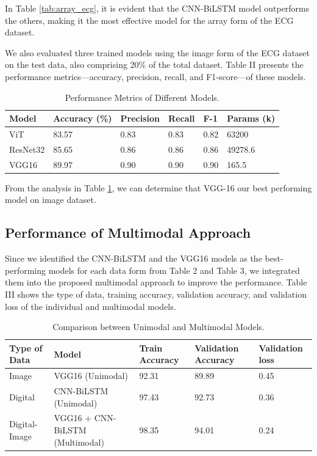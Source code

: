 \documentclass[conference]{IEEEtran}
\begin{document}
In Table \ref{tab:array_ecg}, it is evident that the CNN-BiLSTM model outperforms the others, making it the most effective model for the array form of the ECG dataset.

We also evaluated three trained models using the image form of the ECG dataset on the test data, also comprising 20\% of the total dataset. Table II presents the performance metrics—accuracy, precision, recall, and F1-score—of these models.

\begin{table}[!ht]
\centering
\caption{Performance Metrics of Different Models.}
\begin{tabularx}{\columnwidth}{|X|X|X|X|X|X|}
\hline
Model & Accuracy (\%) & Precision & Recall & F-1 & Params (k) \\ \hline
ViT & 83.57 & 0.83 & 0.83 & 0.82 & 63200 \\ \hline
ResNet32 & 85.65 & 0.86 & 0.86 & 0.86 & 49278.6 \\ \hline
VGG16 & 89.97 & 0.90 & 0.90 & 0.90 & 165.5 \\ \hline
\end{tabularx}
\label{tab:performance_metrics}
\end{table}

From the analysis in Table \ref{tab:performance_metrics}, we can determine that VGG-16 our best performing model on image dataset.

\subsection{Performance of Multimodal Approach}

Since we identified the CNN-BiLSTM and the VGG16 models as the best-performing models for each data form from Table 2 and Table 3, we integrated them into the proposed multimodal approach to improve the performance. Table III shows the type of data, training accuracy, validation accuracy, and validation loss of the individual and multimodal models.

\begin{table}[!ht]
\centering
\caption{Comparison between Unimodal and Multimodal Models.}
\begin{tabularx}{\columnwidth}{|X|X|X|X|X|}
\hline
\textbf{Type of Data} & \textbf{Model} & \textbf{Train Accuracy} &  \textbf{Validation Accuracy} & \textbf{Validation loss} \\
\hline
Image & VGG16 (Unimodal) & 92.31 & 89.89 & 0.45 \\
\hline
Digital & CNN-BiLSTM (Unimodal) & 97.43 & 92.73 & 0.36\\
\hline
Digital-Image & VGG16 + CNN-BiLSTM (Multimodal) & 98.35 &  94.01 & 0.24 \\
\hline
\end{tabularx}
\label{table:multimodal}
\end{table}
 
\end{document}
